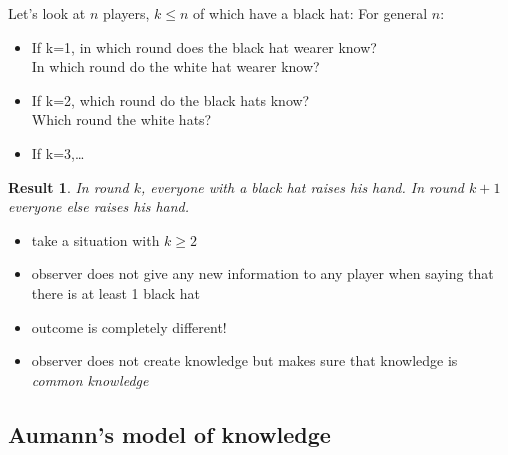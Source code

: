\documentclass{beamer}    %
\theoremstyle{plain}
\newtheorem{result}{Result}
\theoremstyle{definition}
\begin{document}
{\framebreak
Let's look at $n$ players, $k\leq n$ of which have a black hat: 
    For general $n$:
    \begin{itemize}
    \item If k=1, in which round does the black hat wearer know?\\
   In which round do the white hat wearer know?
    \item If k=2, which round do the black hats know?\\
    Which round the white hats?
   \item If k=3,\dots
    \end{itemize}

\framebreak

\begin{result}
  In round $k$, everyone with a black hat raises his hand. In round
  $k+1$ everyone else raises his hand.
\end{result}



\begin{itemize}
\item take a situation with $k\geq 2$
\item observer does not give any new information to any player when saying that there is at least 1 black hat
\item  outcome is completely different!
\item observer does not create knowledge but makes sure that knowledge is \emph{common knowledge}
\end{itemize}

}

 \subsection{Aumann's model of knowledge}
\end{document}
